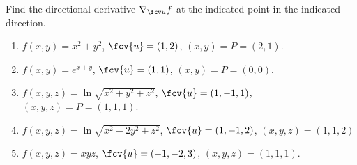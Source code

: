 Find the directional derivative $\nabla_{\fcv u} f$ at the indicated point in the indicated direction.

\begin{enumerate}[ref={\fcProblemRef}]
\item $f(x,y) = x^2+y^2$, $\fcv{u}= (1,2)$, $(x,y)=P=(2,1)$.

\item $f(x,y) = e^{x+y}$, $\fcv{u}= (1,1)$, $(x,y)=P=(0,0)$.

\item $f(x,y, z) = \ln \sqrt{x^2+y^2+z^2}$, $\fcv{u}= (1,-1,1)$, $(x,y,z)=P=(1,1,1)$.

\item $f(x,y, z) = \ln \sqrt{x^2-2y^2+z^2}$, $\fcv{u}= (1,-1,2)$, $(x,y,z)=(1,1,2)$

\item $f(x,y,z) = xyz$, $\fcv{u}= (-1,-2,3)$, $(x,y,z)=(1,1,1)$.

\end{enumerate}